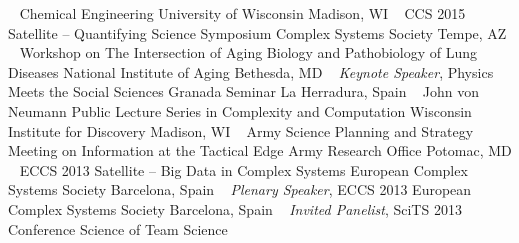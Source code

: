 ~
\Gap
{}
Chemical Engineering
\newline
    University of Wisconsin
    \newline
Madison, WI
\newline
~
\Gap
{}
CCS 2015 Satellite -- Quantifying Science Symposium
\newline
    Complex Systems Society
    \newline
Tempe, AZ
\newline
~
\Gap
{}
Workshop on The Intersection of Aging Biology and Pathobiology of Lung Diseases
\newline
    National Institute of Aging
    \newline
Bethesda, MD
\newline
~
\Gap
{}
\textit{Keynote Speaker}, Physics Meets the Social Sciences
\newline
    Granada Seminar
    \newline
La Herradura, Spain
\newline
~
\Gap
{}
John von Neumann Public Lecture Series in Complexity and Computation
\newline
    Wisconsin Institute for Discovery
    \newline
Madison, WI
\newline
~
\Gap
{}
Army Science Planning and Strategy Meeting on Information at the Tactical Edge
\newline
    Army Research Office
    \newline
Potomac, MD
\newline
~
\Gap
{}
ECCS 2013 Satellite -- Big Data in Complex Systems
\newline
    European Complex Systems Society
    \newline
Barcelona, Spain
\newline
~
\Gap
{}
\textit{Plenary Speaker}, ECCS 2013
\newline
    European Complex Systems Society
    \newline
Barcelona, Spain
\newline
~
\Gap
{}
\textit{Invited Panelist}, SciTS 2013 Conference
\newline
    Science of Team Science
